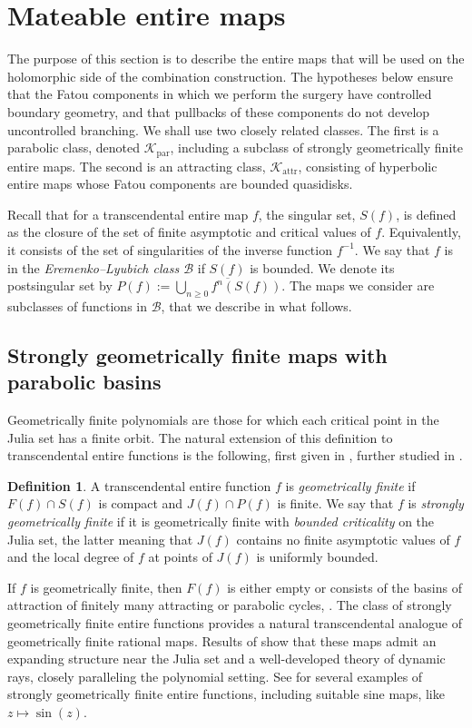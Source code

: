\documentclass[11pt,a4paper, oneside]{amsart}
\theoremstyle{definition}
\newtheorem{defn}[thm]{Definition}
\theoremstyle{remark}
\numberwithin{equation}{section}
\def\B{{\mathcal{B}}}
\renewcommand{\ge}{\geqslant}
\newcommand{\parab}{{\text{par}}}
\newcommand{\attr}{{\text{attr}}}
\begin{document}
\section{Mateable entire maps}\label{Sec:mateable_maps}
The purpose of this section is to describe the entire maps that will be used on the holomorphic side of the combination construction.  The hypotheses below ensure that the Fatou components in which we perform the surgery have controlled boundary geometry, and that pullbacks of these components do not develop uncontrolled branching.  We shall use two closely related classes.  The first is a parabolic class, denoted   $\mathscr K_\parab$, including a subclass of strongly geometrically finite entire maps.  The second is an attracting class, $\mathscr K_\attr$,  consisting of hyperbolic entire maps whose Fatou components are bounded quasidisks.

Recall that for a transcendental entire map $f$, the singular set, $S(f)$, is defined as the closure of the set of finite asymptotic and critical values of $f$. Equivalently, it consists of the set of singularities of the inverse function $f^{-1}$.  We say that $f$ is in the \textit{Eremenko--Lyubich class $\B$} if $S(f)$ is bounded. We denote its postsingular set by  $P(f):=\overline{\bigcup_{n\ge 0} f^n(S(f))}$. The maps we consider are subclasses of functions in $\B$, that we describe in what follows.

\subsection{Strongly geometrically finite maps with parabolic basins}

Geometrically finite polynomials are those for which each critical point
in the Julia set has a finite orbit. The natural extension of this definition to transcendental entire functions is the following, first given in \cite{MB10_landing_geomfinite}, further studied in \cite{ARS22_geomfinite}.
\begin{defn} A transcendental entire function $f$ is \emph{geometrically finite} if $F(f)\cap S(f)$ is compact and $J(f)\cap P(f)$ is finite. 
	We say that $f$ is \emph{strongly geometrically finite} if it is geometrically finite with \textit{bounded criticality} on the Julia set, the latter meaning that $J(f)$ contains no finite asymptotic values of $f$ and the local degree of $f$ at points of $J(f)$ is uniformly bounded.
\end{defn}
If $f$ is geometrically finite, then $F(f)$ is either empty or consists of the basins of attraction of finitely many attracting or parabolic cycles, \cite[Proposition 2.6]{MB10_landing_geomfinite}. The class of strongly geometrically finite entire functions provides a natural transcendental analogue of geometrically finite rational maps. Results of \cite{ARS22_geomfinite} show that these maps admit an expanding structure near the Julia set and a well-developed theory of dynamic rays, closely paralleling the polynomial setting. See \cite[Section 11]{ARS22_geomfinite} for several examples of strongly geometrically finite entire functions, including suitable sine maps, like $z\mapsto \sin(z)$.
\end{document}
